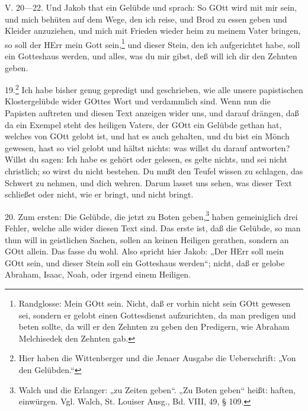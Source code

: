 \begin{schriftzitat}
V. 20—22. Und Jakob that ein Gelübde und sprach: So GOtt wird mit mir sein, und mich behüten auf dem Wege, den ich reise, und Brod zu essen geben und Kleider anzuziehen, und mich mit Frieden wieder heim zu meinem Vater bringen, so soll der HErr mein Gott sein,\footnote{Randglosse: Mein GOtt sein. Nicht, daß er vorhin nicht sein GOtt gewesen sei, sondern er gelobt einen Gottesdienst aufzurichten, da man predigen und beten sollte, da will er den Zehnten zu geben den Predigern, wie Abraham Melchisedek den Zehnten gab.} und dieser Stein, den ich aufgerichtet habe, soll ein Gotteshaus werden, und alles, was du mir gibst, deß will ich dir den Zehnten geben.
\end{schriftzitat}

19.\footnote{Hier haben die Wittenberger und die Jenaer Ausgabe die Ueberschrift: „Von den Gelübden.“} Ich habe bisher genug gepredigt und geschrieben, wie alle unsere papistischen Klostergelübde wider GOttes Wort und verdammlich sind. Wenn nun die Papisten auftreten und diesen Text anzeigen wider uns, und darauf drängen, daß da ein Exempel steht des heiligen Vaters, der GOtt ein Gelübde gethan hat, welches von GOtt gelobt ist, und hat es auch gehalten, und du bist ein Mönch gewesen, hast so viel gelobt und hältst nichts: was willst du darauf antworten? Willst du sagen: Ich habe es gehört oder gelesen, es gelte nichts, und sei nicht christlich; so wirst du nicht bestehen. Du mußt den Teufel wissen zu schlagen, das Schwert zu nehmen, und dich wehren. Darum lasset uns sehen, was dieser Text schließet oder nicht, wie er bringt, und nicht bringt.

20. Zum ersten: Die Gelübde, die jetzt zu Boten geben,\footnote{Walch und die Erlanger: „zu Zeiten geben“. „Zu Boten geben“ heißt: haften, einwürgen. Vgl. Walch, St. Louiser Ausg., Bd. VIII, 49, § 109.} haben gemeiniglich drei Fehler, welche alle wider diesen Text sind. Das erste ist, daß die Gelübde, so man thun will in geistlichen Sachen, sollen an keinen Heiligen gerathen, sondern an GOtt allein. Das fasse du wohl. Also spricht hier Jakob: „Der HErr soll mein GOtt sein, und dieser Stein soll ein Gotteshaus werden“; nicht, daß er gelobe Abraham, Isaac, Noah, oder irgend einem Heiligen.
